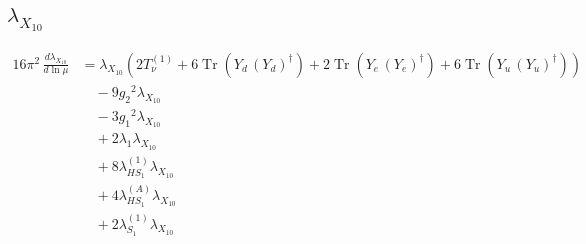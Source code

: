 \documentclass[10pt,a4paper]{article}
\begin{document}
\subsection*{$\lambda_{X_{10}}$}
\begin{align*}
16\pi^2\,\frac{d \lambda_{X_{10}}}{d\ln\mu} &={\lambda_{X_{10}}} (2 T_{\nu}^{(1)}+6 \operatorname{Tr}\!\left({Y_d}\,\left({Y_d}\right)^{\dagger}\right)+2 \operatorname{Tr}\!\left({Y_e}\,\left({Y_e}\right)^{\dagger}\right)+6 \operatorname{Tr}\!\left({Y_u}\,\left({Y_u}\right)^{\dagger}\right)) \\
&\quad -9 {g_2}^2 {\lambda_{X_{10}}} \\
&\quad -3 {g_1}^2 {\lambda_{X_{10}}} \\
&\quad +2 {\lambda_1} {\lambda_{X_{10}}} \\
&\quad +8 {\lambda_{HS_1}^{(1)}} {\lambda_{X_{10}}} \\
&\quad +4 {\lambda_{HS_1}^{(A)}} {\lambda_{X_{10}}} \\
&\quad +2 {\lambda_{S_1}^{(1)}} {\lambda_{X_{10}}} \\
\end{align*}
\end{document}
